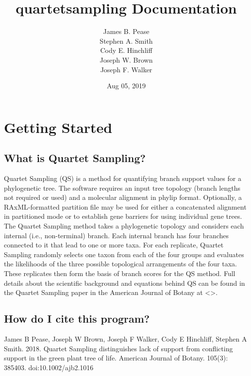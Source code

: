 \documentclass[letterpaper,12pt,english]{sphinxmanual}
\title{quartetsampling Documentation}
\date{Aug 05, 2019}
\author{James B. Pease \\ Stephen A. Smith \\ Cody E. Hinchliff \\Joseph W. Brown \\ Joseph F. Walker}
\begin{document}
\maketitle
\sphinxtableofcontents
{}\label{\detokenize{index::doc}}



\chapter{Getting Started}
\label{\detokenize{intro:manual-for-quartetsampling}}\label{\detokenize{intro::doc}}\label{\detokenize{intro:intro}}\label{\detokenize{intro:getting-started}}

\section{What is Quartet Sampling?}
\label{\detokenize{intro:what-is-quartet-sampling}}
Quartet Sampling (QS) is a method for quantifying branch support values for a phylogenetic tree.  The software requires an input tree topology (branch lengths not required or used) and a molecular alignment in phylip format.  Optionally, a RAxML-formatted partition file may be used for either a concatenated alignment in partitioned mode or to establish gene barriers for using individual gene trees.  The Quartet Sampling method takes a phylogenetic topology and considers each internal (i.e., non-terminal) branch.  Each internal branch has four branches connected to it that lead to one or more taxa.  For each replicate, Quartet Sampling randomly selects one taxon from each of the four groups and evaluates the likelihoods of the three possible topological arrangements of the four taxa.  These replicates then form the basis of branch scores for the QS method.  Full details about the scientific background and equations behind QS can be found in the Quartet Sampling paper in the American Journal of Botany at \textless{}\textgreater{}.


\section{How do I cite this program?}
\label{\detokenize{intro:how-do-i-cite-this-program}}
James B Pease, Joseph W Brown, Joseph F Walker, Cody E Hinchliff, Stephen A Smith. 2018. Quartet Sampling distinguishes lack of support from conflicting support in the green plant tree of life. American Journal of Botany. 105(3): 385\textendash{}403. doi:10.1002/ajb2.1016
\end{document}
